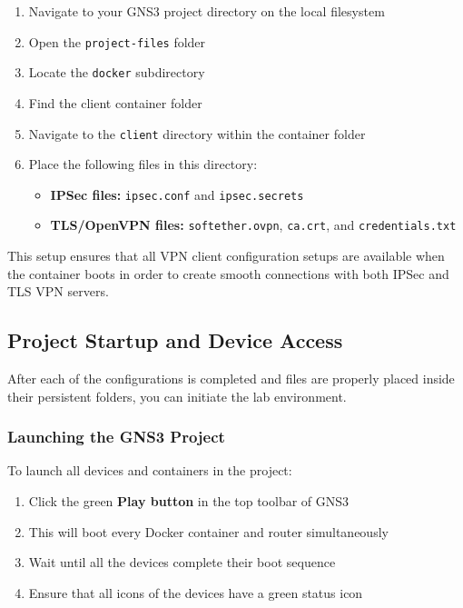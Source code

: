 \begin{enumerate}
    \item Navigate to your GNS3 project directory on the local filesystem
    \item Open the \texttt{project-files} folder
    \item Locate the \texttt{docker} subdirectory
    \item Find the client container folder
    \item Navigate to the \texttt{client} directory within the container folder
    \item Place the following files in this directory:
    \begin{itemize}
        \item \textbf{IPSec files:} \texttt{ipsec.conf} and \texttt{ipsec.secrets}
        \item \textbf{TLS/OpenVPN files:} \texttt{softether.ovpn}, \texttt{ca.crt}, and \texttt{credentials.txt}
    \end{itemize}
\end{enumerate}

\noindent
This setup ensures that all VPN client configuration setups are available when the container boots in order to create smooth connections with both IPSec and TLS VPN servers.

\subsection{Project Startup and Device Access}

After each of the configurations is completed and files are properly placed inside their persistent folders, you can initiate the lab environment.

\subsubsection{Launching the GNS3 Project}

To launch all devices and containers in the project:

\begin{enumerate}
    \item Click the green \textbf{Play button} in the top toolbar of GNS3
    \item This will boot every Docker container and router simultaneously
    \item Wait until all the devices complete their boot sequence
    \item Ensure that all icons of the devices have a green status icon
\end{enumerate}

